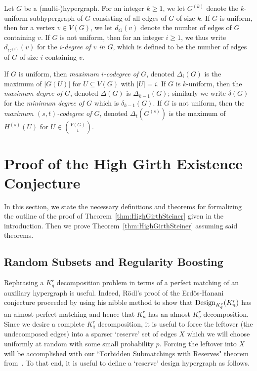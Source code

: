 \documentclass[11pt]{article}
\newcounter{i}
\theoremstyle{plain}
\theoremstyle{plain} %
\theoremstyle{definition}
\begin{document}
Let $G$ be a (multi-)hypergraph. For an integer $k\ge 1$, we let $G^{(k)}$ denote the $k$-uniform subhypergraph of $G$ consisting of all edges of $G$ of size $k$. If $G$ is uniform, then for a vertex $v \in V(G)$, we let $d_G(v)$ denote the number of edges of $G$ containing $v$. If $G$ is not uniform, then for an integer $i\ge 1$, we thus write $d_{G^{(i)}}(v)$ for the \emph{$i$-degree of $v$ in $G$}, which is defined to be the number of edges of $G$ of size $i$ containing $v$. 

If $G$ is uniform, then \emph{maximum $i$-codegree of $G$}, denoted $\Delta_i(G)$ is the maximum of $|G(U)|$ for $U\subseteq V(G)$ with $|U|=i$. If $G$ is $k$-uniform, then the \emph{maximum degree of $G$}, denoted $\Delta(G)$ is $\Delta_{k-1}(G)$; similarly we write $\delta(G)$ for the \emph{minimum degree of $G$} which is $\delta_{k-1}(G)$. If $G$ is not uniform, then the \emph{maximum $(s,t)$-codegree of $G$}, denoted $\Delta_{t}\left(G^{(s)}\right)$ is the maximum of $H^{(s)}(U)$ for $U\in \binom{V(G)}{t}$.
 
\section{Proof of the High Girth Existence Conjecture}\label{s:HighGirthExistence}

In this section, we state the necessary definitions and theorems for formalizing the outline of the proof of Theorem~\ref{thm:HighGirthSteiner} given in the introduction. Then we prove Theorem~\ref{thm:HighGirthSteiner} assuming said theorems.

\subsection{Random Subsets and Regularity Boosting}

Rephrasing a $K_q^r$ decomposition problem in terms of a perfect matching of an auxiliary hypergraph is useful. Indeed, R\"odl's proof of the Erd\H{o}s-Hanani conjecture proceeded by using his nibble method to show that ${\rm Design}_{K_q^r}(K_n^r)$ has an almost perfect matching and hence that $K_n^r$ has an almost $K_q^r$ decomposition. Since we desire a complete $K_q^r$ decomposition, it is useful to force the leftover (the undecomposed edges) into a sparser `reserve' set of edges $X$ which we will choose uniformly at random with some small probability $p$. Forcing the leftover into $X$ will be accomplished with our ``Forbidden Submatchings with Reserves" theorem from~\cite{DP22}. To that end, it is useful to define a `reserve' design hypergraph as follows.
\end{document}
